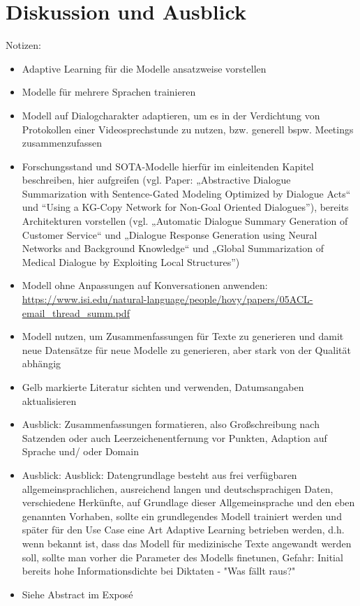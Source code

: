 \chapter{Diskussion und Ausblick}
\thispagestyle{fancy}
\label{chap:Diskussion und Ausblick}

Notizen:
\begin{itemize}
	\item Adaptive Learning für die Modelle ansatzweise vorstellen
	\item Modelle für mehrere Sprachen trainieren
	\item Modell auf Dialogcharakter adaptieren, um es in der Verdichtung von Protokollen einer Videosprechstunde zu nutzen, bzw. generell bspw. Meetings zusammenzufassen
	\item Forschungsstand und SOTA-Modelle hierfür im einleitenden Kapitel beschreiben, hier aufgreifen (vgl. Paper: „Abstractive Dialogue Summarization with Sentence-Gated Modeling Optimized by Dialogue Acts“ und “Using a KG-Copy Network for Non-Goal Oriented Dialogues”), bereits Architekturen vorstellen (vgl. „Automatic Dialogue Summary Generation of Customer Service“ und „Dialogue Response Generation using Neural Networks and Background Knowledge“ und „Global Summarization of Medical Dialogue by Exploiting Local Structures”)
	\item Modell ohne Anpassungen auf Konversationen anwenden: \url{https://www.isi.edu/natural-language/people/hovy/papers/05ACL-email_thread_summ.pdf}
	\item Modell nutzen, um Zusammenfassungen für Texte zu generieren und damit neue Datensätze für neue Modelle zu generieren, aber stark von der Qualität abhängig
	\item Gelb markierte Literatur sichten und verwenden, Datumsangaben aktualisieren
	\item Ausblick: Zusammenfassungen formatieren, also Großschreibung nach Satzenden oder auch Leerzeichenentfernung vor Punkten, Adaption auf Sprache und/ oder Domain
	\item Ausblick: Ausblick: Datengrundlage besteht aus frei verfügbaren allgemeinsprachlichen, ausreichend langen und deutschsprachigen Daten, verschiedene Herkünfte, auf Grundlage dieser Allgemeinsprache und den eben genannten Vorhaben, sollte ein grundlegendes Modell trainiert werden und später für den Use Case eine Art Adaptive Learning betrieben werden, d.h. wenn bekannt ist, dass das Modell für medizinische Texte angewandt werden soll, sollte man vorher die Parameter des Modells finetunen, Gefahr: Initial bereits hohe Informationsdichte bei Diktaten - "Was fällt raus?"
	\item Siehe Abstract im Exposé
\end{itemize}
